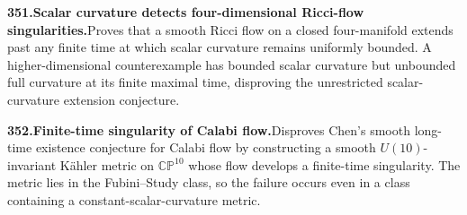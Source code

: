 \documentclass[11pt,a4paper]{article}
\begin{document}
  \par \begin{minipage}{\linewidth}
  \fontsize{10.5}{12.6}\selectfont\RaggedRight
  \hypertarget{result 351}{}
  {\bfseries\textcolor{muted}{351.}\enspace Scalar curvature detects four-dimensional Ricci-flow singularities.}\enspace Proves that a smooth Ricci flow on a closed four-manifold extends past any finite time at which scalar curvature remains uniformly bounded. A higher-dimensional counterexample has bounded scalar curvature but unbounded full curvature at its finite maximal time, disproving the unrestricted scalar-curvature extension conjecture.\par
  \end{minipage}\par\vspace{5pt}



  \par \begin{minipage}{\linewidth}
  \fontsize{10.5}{12.6}\selectfont\RaggedRight
  \hypertarget{result 352}{}
  {\bfseries\textcolor{muted}{352.}\enspace Finite-time singularity of Calabi flow.}\enspace Disproves Chen's smooth long-time existence conjecture for Calabi flow by constructing a smooth $U(10)$-invariant K\"ahler metric on $\mathbb{CP}^{10}$ whose flow develops a finite-time singularity. The metric lies in the Fubini--Study class, so the failure occurs even in a class containing a constant-scalar-curvature metric.\par
  \end{minipage}\par\vspace{5pt}
\end{document}
